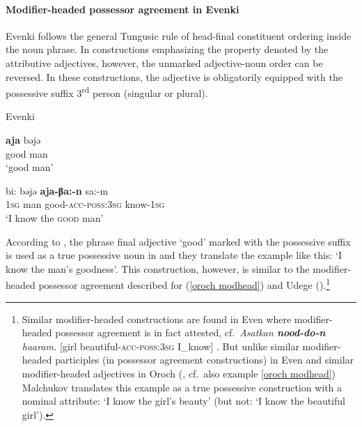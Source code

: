 \paragraph*{Modifier\hyp{}headed possessor agreement in Evenki}
Evenki follows the general Tungusic rule of head-final constituent ordering inside the noun phrase. In constructions emphasizing the property denoted by the attributive adjectives, however, the unmarked adjective-noun order can be reversed. In these constructions, the adjective is obligatorily equipped with the possessive suffix 3\textsuperscript{rd} person (singular or plural).
\begin{exe}
\ex 
{\rm Evenki \citep[18]{bulatova-etal1999}}
\begin{xlist}
\ex	
\gll	\textbf{aja} bəjə\\
	good man\\
\glt	‘good man’

\newpage 
\ex
\label{evenki poss}
\gll	bi: bəjə \textbf{aja-βa:-n} sa:-m\\
	\textsc{1sg} man good-\textsc{acc}-\textsc{poss:3sg} know-\textsc{1sg}\\
\glt	‘I know the \textsc{good} man’
\end{xlist}
\end{exe}
According to \citet[18]{bulatova-etal1999}, the phrase final adjective ‘good’ marked with the possessive suffix is used as a true possessive noun in  and they translate the example like this: ‘I know the man's goodness’. This construction, however, is similar to the modifier\hyp{}headed possessor agreement described for  (\ref{oroch modhead}) and Udege (\citealt[485, passim]{nikolaeva-etal2001}).\footnote{Similar modifier\hyp{}headed constructions are found in Even where modifier\hyp{}headed possessor agreement is in fact attested, cf.~\textit{Asatkan \textbf{nood-do-n} haaram.} [girl beautiful-\textsc{acc}-\textsc{poss:3sg} I\_know] \citep[11]{malchukov1995}. But unlike similar modifier\hyp{}headed participles (in possessor agreement constructions) in Even \citep[31]{malchukov1995} and similar modifier\hyp{}headed adjectives in Oroch (\citealt{malchukov2000}, cf.~also example \ref{oroch modhead}) Malchukov translates this example as a true possessive construction with a nominal attribute: ‘I know the girl's beauty’ (but not: ‘I know the beautiful girl’).}

